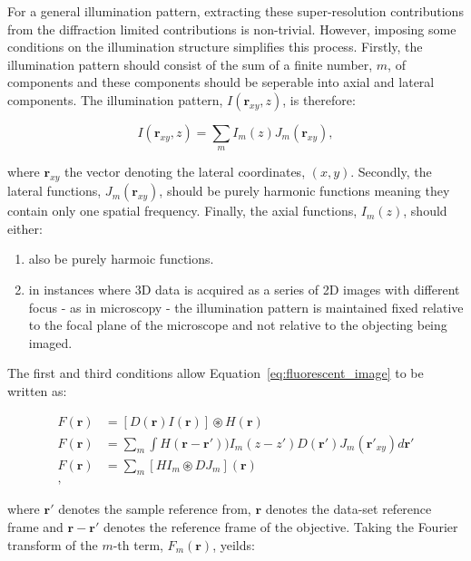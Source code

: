 For a general illumination pattern, extracting these super-resolution 
contributions from the diffraction limited contributions is non-trivial.
However, imposing some conditions on the illumination structure simplifies
this process\cite{gustafsson2008three}. Firstly, the illumination pattern 
should consist of the sum of a finite number, $m$, of components and these
components should be seperable into axial and lateral components. The 
illumination pattern, $I(\textbf{r}_{xy},z)$, is therefore:

\begin{equation}\label{eq:illumination_components}
	I(\textbf{r}_{xy},z) = \sum\limits_{m}{I_{m}(z)J_{m}(\textbf{r}_{xy})},
\end{equation}

where $\textbf{r}_{xy}$ the vector denoting the lateral coordinates, $(x,y)$.
Secondly, the lateral functions, $J_{m}(\textbf{r}_{xy})$, should be purely
harmonic functions meaning they contain only one spatial frequency. Finally, 
the axial functions, $I_{m}(z)$, should either: 

\begin{enumerate}
	\item also be purely harmoic functions.
	\item in instances where 3D data is acquired as a series of 2D images with 
	different focus - as in microscopy - the illumination pattern is maintained 
	fixed relative to the focal plane of the microscope and not relative to the
	objecting being imaged.
\end{enumerate}

The first and third conditions allow Equation~\ref{eq:fluorescent_image} to be
written as:

\begin{equation}\label{eq:fluorescent_image_conditions}
\begin{split}
	F(\textbf{r}) &= [D(\textbf{r})I(\textbf{r})] \circledast H(\textbf{r})\\
	F(\textbf{r}) &= \sum\limits_{m}{\int H(\textbf{r}-\textbf{r}'))I_{m}(z - z')D(\textbf{r}')J_{m}(\textbf{r}'_{xy})}d\textbf{r}'\\
	F(\textbf{r}) &= \sum\limits_{m}{\left[HI_{m}\circledast DJ_{m}\right](\textbf{r})}\\,
\end{split}
\end{equation}

where $\textbf{r}'$ denotes the sample reference from, $\textbf{r}$ denotes
the data-set reference frame and $\textbf{r} - \textbf{r}'$ denotes the 
reference frame of the objective. Taking the Fourier transform of the 
$m$-th term, $F_{m}(\textbf{r})$, yeilds:

